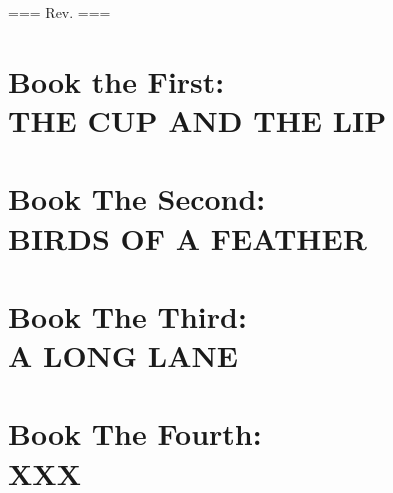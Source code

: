 \documentclass[12pt]{book}
\begin{document}
\noindent
=== Rev. \rev ===

\newpage


\part{Book the First:\\THE CUP AND THE LIP}



















\part{Book The Second:\\BIRDS OF A FEATHER}


















\part{Book The Third:\\A LONG LANE}



















\part{Book The Fourth:\\XXX}


















\end{document}
